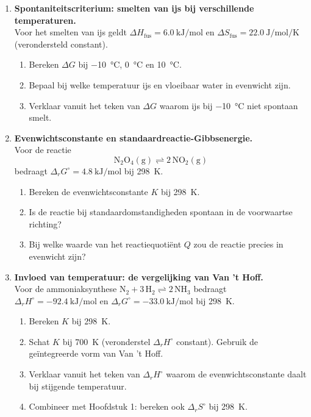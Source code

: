 \begin{enumerate}
\item \textbf{Spontaniteitscriterium: smelten van ijs bij verschillende temperaturen.} \\
Voor het smelten van ijs geldt $\Delta H_{\text{fus}} = \SI{6.0}{\kilo\joule\per\mole}$ en $\Delta S_{\text{fus}} = \SI{22.0}{\joule\per\mole\per\kelvin}$ (verondersteld constant).
\begin{enumerate}
\item[(a)] Bereken $\Delta G$ bij \SI{-10}{\celsius}, \SI{0}{\celsius} en \SI{+10}{\celsius}.
\item[(b)] Bepaal bij welke temperatuur ijs en vloeibaar water in evenwicht zijn.
\item[(c)] Verklaar vanuit het teken van $\Delta G$ waarom ijs bij \SI{-10}{\celsius} niet spontaan smelt.
\end{enumerate}

\item \textbf{Evenwichtsconstante en standaardreactie-Gibbsenergie.} \\
Voor de reactie
\[
\mathrm{N_2O_4(g) \rightleftharpoons 2\,NO_2(g)}
\]
bedraagt $\Delta_r G^\circ = \SI{+4.8}{\kilo\joule\per\mole}$ bij \SI{298}{\kelvin}.
\begin{enumerate}
\item[(a)] Bereken de evenwichtsconstante $K$ bij \SI{298}{\kelvin}.
\item[(b)] Is de reactie bij standaardomstandigheden spontaan in de voorwaartse richting?
\item[(c)] Bij welke waarde van het reactiequoti\"ent $Q$ zou de reactie precies in evenwicht zijn?
\end{enumerate}

\item \textbf{Invloed van temperatuur: de vergelijking van Van 't Hoff.} \\
Voor de ammoniaksynthese $\mathrm{N_2 + 3\,H_2 \rightleftharpoons 2\,NH_3}$ bedraagt $\Delta_r H^\circ = \SI{-92.4}{\kilo\joule\per\mole}$ en $\Delta_r G^\circ = \SI{-33.0}{\kilo\joule\per\mole}$ bij \SI{298}{\kelvin}.
\begin{enumerate}
\item[(a)] Bereken $K$ bij \SI{298}{\kelvin}.
\item[(b)] Schat $K$ bij \SI{700}{\kelvin} (veronderstel $\Delta_r H^\circ$ constant). Gebruik de ge\"integreerde vorm van Van 't Hoff.
\item[(c)] Verklaar vanuit het teken van $\Delta_r H^\circ$ waarom de evenwichtsconstante daalt bij stijgende temperatuur.
\item[(d)] Combineer met Hoofdstuk 1: bereken ook $\Delta_r S^\circ$ bij \SI{298}{\kelvin}.
\end{enumerate}


\end{enumerate}
